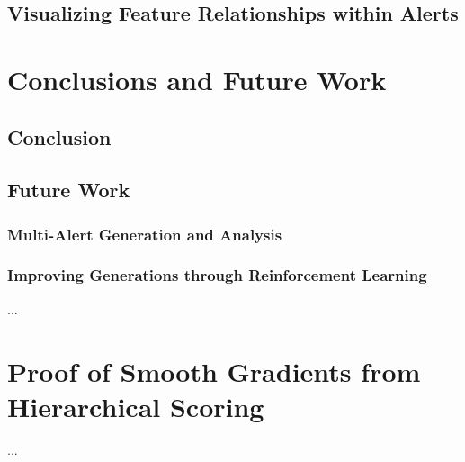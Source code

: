 \documentclass[12pt,american]{report}
\begin{document}
\section{Visualizing Feature Relationships within Alerts}

\chapter{Conclusions and Future Work}

\section{Conclusion}

\section{Future Work}

\subsection{Multi-Alert Generation and Analysis}

\subsection{Improving Generations through Reinforcement Learning}

  ...
  \nocite{*}


\begin{singlespace}

\end{singlespace}

\appendix
\chapter{Proof of Smooth Gradients from Hierarchical Scoring}
  ...
\end{document}
